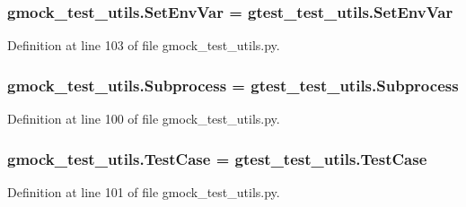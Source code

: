 \subsubsection[{\texorpdfstring{Set\+Env\+Var}{SetEnvVar}}]{\setlength{\rightskip}{0pt plus 5cm}gmock\+\_\+test\+\_\+utils.\+Set\+Env\+Var = gtest\+\_\+test\+\_\+utils.\+Set\+Env\+Var}\hypertarget{namespacegmock__test__utils_ab0c69f8ce649fdd5a17f99deedf3eb29}{}\label{namespacegmock__test__utils_ab0c69f8ce649fdd5a17f99deedf3eb29}


Definition at line 103 of file gmock\+\_\+test\+\_\+utils.\+py.

\subsubsection[{\texorpdfstring{Subprocess}{Subprocess}}]{\setlength{\rightskip}{0pt plus 5cm}gmock\+\_\+test\+\_\+utils.\+Subprocess = {\bf gtest\+\_\+test\+\_\+utils.\+Subprocess}}\hypertarget{namespacegmock__test__utils_a31a0e33565ec805d314cb0a4eb8317e6}{}\label{namespacegmock__test__utils_a31a0e33565ec805d314cb0a4eb8317e6}


Definition at line 100 of file gmock\+\_\+test\+\_\+utils.\+py.

\subsubsection[{\texorpdfstring{Test\+Case}{TestCase}}]{\setlength{\rightskip}{0pt plus 5cm}gmock\+\_\+test\+\_\+utils.\+Test\+Case = gtest\+\_\+test\+\_\+utils.\+Test\+Case}\hypertarget{namespacegmock__test__utils_a959c5af591e4d49b6d35745205b64509}{}\label{namespacegmock__test__utils_a959c5af591e4d49b6d35745205b64509}


Definition at line 101 of file gmock\+\_\+test\+\_\+utils.\+py.

